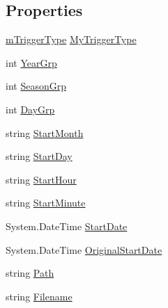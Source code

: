 \subsection*{Properties}
\begin{DoxyCompactItemize}
\item 
\hyperlink{class_s_e_a_r_c_h_1_1_map_swap_trigger_a293d493ac648d62dd39a2be6a8f7ff57}{m\-Trigger\-Type} \hyperlink{class_s_e_a_r_c_h_1_1_map_swap_trigger_ad78240ed34f35d77765b11ba553310cb}{My\-Trigger\-Type}
\item 
int \hyperlink{class_s_e_a_r_c_h_1_1_map_swap_trigger_aeb5c52a1e6a860cad8f9c33e589d8f02}{Year\-Grp}
\item 
int \hyperlink{class_s_e_a_r_c_h_1_1_map_swap_trigger_aab3ddb41ca60a79a37990b91e54eede4}{Season\-Grp}
\item 
int \hyperlink{class_s_e_a_r_c_h_1_1_map_swap_trigger_aad1363d2548dd807ab35ab3201766ec7}{Day\-Grp}
\item 
string \hyperlink{class_s_e_a_r_c_h_1_1_map_swap_trigger_a34aae23325a23e73fcac09220cd7ba34}{Start\-Month}
\item 
string \hyperlink{class_s_e_a_r_c_h_1_1_map_swap_trigger_a9c72618cf0599bde747f74d6bdff0564}{Start\-Day}
\item 
string \hyperlink{class_s_e_a_r_c_h_1_1_map_swap_trigger_abe8a3d6289f9b91f880c806c1513d23b}{Start\-Hour}
\item 
string \hyperlink{class_s_e_a_r_c_h_1_1_map_swap_trigger_a48a4deb9d2e065b1490580f0296913e6}{Start\-Minute}
\item 
System.\-Date\-Time \hyperlink{class_s_e_a_r_c_h_1_1_map_swap_trigger_a54e56a659c74906c32a4d52be8bdb13d}{Start\-Date}
\item 
System.\-Date\-Time \hyperlink{class_s_e_a_r_c_h_1_1_map_swap_trigger_ada0854cccab56b3848a4f0c6ccabc200}{Original\-Start\-Date}
\item 
string \hyperlink{class_s_e_a_r_c_h_1_1_map_swap_trigger_a1433599fc5a3a263d2076f1ea68c8cd1}{Path}
\item 
string \hyperlink{class_s_e_a_r_c_h_1_1_map_swap_trigger_abc7b84ca520a70a857ef566eacfdb2a8}{Filename}
\end{DoxyCompactItemize}


